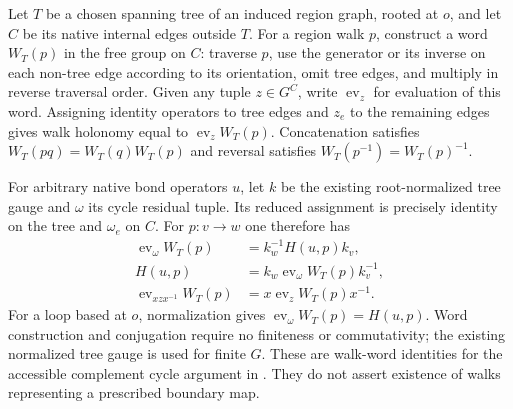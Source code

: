 \begin{lemma}%
    \label{thm:peps_regular_region_cycle_holonomy}
    \leanok
    Let $T$ be a chosen spanning tree of an induced region graph, rooted
    at $o$, and let $C$ be its native internal edges outside $T$.
    For a region walk $p$, construct a word $W_T(p)$ in the
    free group on $C$: traverse $p$, use the generator or its inverse
    on each non-tree edge according to its orientation, omit tree edges,
    and multiply in reverse traversal order. Given any tuple $z\in G^C$,
    write $\operatorname{ev}_z$ for evaluation of this word. Assigning
    identity operators to tree edges and $z_e$ to the remaining edges
    gives walk holonomy equal to $\operatorname{ev}_zW_T(p)$.
    Concatenation satisfies $W_T(pq)=W_T(q)W_T(p)$ and reversal satisfies
    $W_T(p^{-1})=W_T(p)^{-1}$.

    For arbitrary native bond operators $u$, let $k$ be the existing
    root-normalized tree gauge and $\omega$ its cycle residual tuple.
    Its reduced assignment is precisely identity on the tree and
    $\omega_e$ on $C$. For $p:v\to w$ one therefore has
    \begin{align}
        \operatorname{ev}_{\omega}W_T(p) & =k_w^{-1}H(u,p)k_v,                           \\
        H(u,p)                           & =k_w\operatorname{ev}_{\omega}W_T(p)k_v^{-1}, \\
        \operatorname{ev}_{xzx^{-1}}W_T(p)
                                         & =x\operatorname{ev}_zW_T(p)x^{-1}.
    \end{align}
    For a loop based at $o$, normalization gives
    $\operatorname{ev}_{\omega}W_T(p)=H(u,p)$.
    Word construction and conjugation require no finiteness or
    commutativity; the existing normalized tree gauge is used for finite $G$.
    These are walk-word identities for the accessible complement
    cycle argument in \cite[Theorem~6.9]{Schuch2010PEPS}. They do not
    assert existence of walks representing a prescribed boundary map.
\end{lemma}

